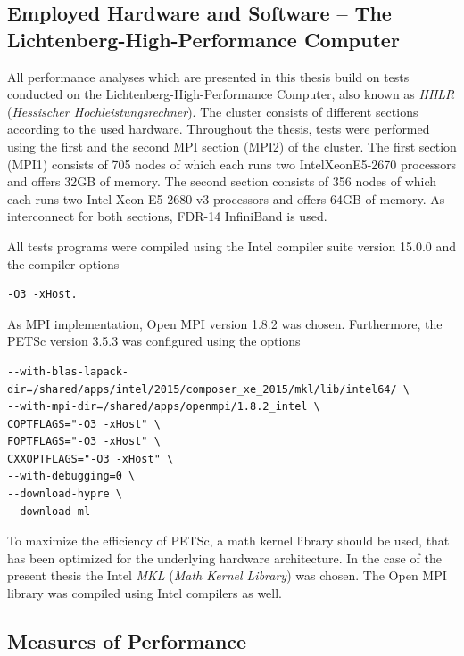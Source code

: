 \subsection{Employed Hardware and Software -- The Lichtenberg-High-Performance Computer }
\label{sec:hhlr}

All performance analyses which are presented in this thesis build on tests conducted on the Lichtenberg-High-Performance Computer, also known as \emph{HHLR} (\emph{Hessischer Hochleistungsrechner}). The cluster consists of different sections according to the used hardware. Throughout the thesis, tests were performed using the first and the second MPI section (MPI2) of the cluster. The first section (MPI1) consists of 705 nodes of which each runs two Intel\textregistered Xeon\textregistered E5-2670 processors and offers 32GB of memory. The second section consists of 356 nodes of which each runs two Intel Xeon E5-2680 v3 processors and offers 64GB of memory. As interconnect for both sections, FDR-14 InfiniBand is used.

All tests programs were compiled using the Intel compiler suite version 15.0.0 and the compiler options
\begin{lstlisting}
-O3 -xHost.
\end{lstlisting}
As MPI implementation, Open MPI version 1.8.2 was chosen. Furthermore, the PETSc version 3.5.3 was configured using the options
\begin{lstlisting}
--with-blas-lapack-dir=/shared/apps/intel/2015/composer_xe_2015/mkl/lib/intel64/ \
--with-mpi-dir=/shared/apps/openmpi/1.8.2_intel \
COPTFLAGS="-O3 -xHost" \
FOPTFLAGS="-O3 -xHost" \
CXXOPTFLAGS="-O3 -xHost" \
--with-debugging=0 \
--download-hypre \
--download-ml
\end{lstlisting}
To maximize the efficiency of PETSc, a math kernel library should be used, that has been optimized for the underlying hardware architecture. In the case of the present thesis the Intel \emph{MKL} (\emph{Math Kernel Library}) was chosen. The Open MPI library was compiled using Intel compilers as well.

\subsection{Measures of Performance}

